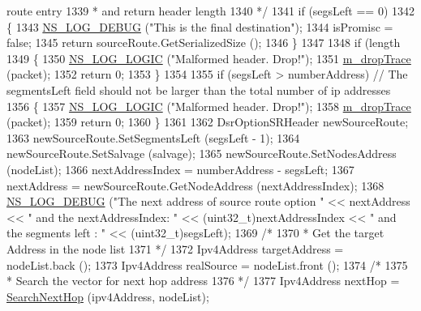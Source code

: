 \begin{DoxyCode}
{       route entry}
1339 \textcolor{comment}{       * and return header length}
1340 \textcolor{comment}{       */}
1341       \textcolor{keywordflow}{if} (segsLeft == 0)
1342         \{
1343           \hyperlink{group__logging_ga413f1886406d49f59a6a0a89b77b4d0a}{NS\_LOG\_DEBUG} (\textcolor{stringliteral}{"This is the final destination"});
1344           isPromisc = \textcolor{keyword}{false};
1345           \textcolor{keywordflow}{return} sourceRoute.GetSerializedSize ();
1346         \}
1347 
1348       \textcolor{keywordflow}{if} (length %
1349         \{
1350           \hyperlink{group__logging_ga88acd260151caf2db9c0fc84997f45ce}{NS\_LOG\_LOGIC} (\textcolor{stringliteral}{"Malformed header. Drop!"});
1351           \hyperlink{classns3_1_1dsr_1_1DsrOptions_a176bbc9efb58b6d750c14b9b03c525c4}{m\_dropTrace} (packet);
1352           \textcolor{keywordflow}{return} 0;
1353         \}
1354 
1355       \textcolor{keywordflow}{if} (segsLeft > numberAddress) \textcolor{comment}{// The segmentsLeft field should not be larger than the total number of
       ip addresses}
1356         \{
1357           \hyperlink{group__logging_ga88acd260151caf2db9c0fc84997f45ce}{NS\_LOG\_LOGIC} (\textcolor{stringliteral}{"Malformed header. Drop!"});
1358           \hyperlink{classns3_1_1dsr_1_1DsrOptions_a176bbc9efb58b6d750c14b9b03c525c4}{m\_dropTrace} (packet);
1359           \textcolor{keywordflow}{return} 0;
1360         \}
1361 
1362       DsrOptionSRHeader newSourceRoute;
1363       newSourceRoute.SetSegmentsLeft (segsLeft - 1);
1364       newSourceRoute.SetSalvage (salvage);
1365       newSourceRoute.SetNodesAddress (nodeList);
1366       nextAddressIndex = numberAddress - segsLeft;
1367       nextAddress = newSourceRoute.GetNodeAddress (nextAddressIndex);
1368       \hyperlink{group__logging_ga413f1886406d49f59a6a0a89b77b4d0a}{NS\_LOG\_DEBUG} (\textcolor{stringliteral}{"The next address of source route option "} << nextAddress << \textcolor{stringliteral}{" and the
       nextAddressIndex: "} << (uint32\_t)nextAddressIndex << \textcolor{stringliteral}{" and the segments left : "} << (uint32\_t)segsLeft);
1369       \textcolor{comment}{/*}
1370 \textcolor{comment}{       * Get the target Address in the node list}
1371 \textcolor{comment}{       */}
1372       Ipv4Address targetAddress = nodeList.back ();
1373       Ipv4Address realSource = nodeList.front ();
1374       \textcolor{comment}{/*}
1375 \textcolor{comment}{       * Search the vector for next hop address}
1376 \textcolor{comment}{       */}
1377       Ipv4Address nextHop = \hyperlink{classns3_1_1dsr_1_1DsrOptions_a061c66ba810a71ae227371a45cc30cc0}{SearchNextHop} (ipv4Address, nodeList);

\end{DoxyCode}
